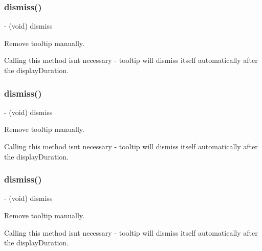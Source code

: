 \subsubsection{\texorpdfstring{dismiss()}{dismiss()}\hspace{0.1cm}{\footnotesize\ttfamily [1/5]}}
{\footnotesize\ttfamily -\/ (void) dismiss \begin{DoxyParamCaption}{ }\end{DoxyParamCaption}}

Remove tooltip manually.

Calling this method isn\textquotesingle{}t necessary -\/ tooltip will dismiss itself automatically after the {\ttfamily display\+Duration}. \mbox{\label{interfaceFBTooltipView_a569c1c43f92dd609d969f75bf151ae87}} 
\subsubsection{\texorpdfstring{dismiss()}{dismiss()}\hspace{0.1cm}{\footnotesize\ttfamily [2/5]}}
{\footnotesize\ttfamily -\/ (void) dismiss \begin{DoxyParamCaption}{ }\end{DoxyParamCaption}}

Remove tooltip manually.

Calling this method isn\textquotesingle{}t necessary -\/ tooltip will dismiss itself automatically after the {\ttfamily display\+Duration}. \mbox{\label{interfaceFBTooltipView_a569c1c43f92dd609d969f75bf151ae87}} 
\subsubsection{\texorpdfstring{dismiss()}{dismiss()}\hspace{0.1cm}{\footnotesize\ttfamily [3/5]}}
{\footnotesize\ttfamily -\/ (void) dismiss \begin{DoxyParamCaption}{ }\end{DoxyParamCaption}}

Remove tooltip manually.

Calling this method isn\textquotesingle{}t necessary -\/ tooltip will dismiss itself automatically after the {\ttfamily display\+Duration}. \mbox{\label{interfaceFBTooltipView_a569c1c43f92dd609d969f75bf151ae87}} 
